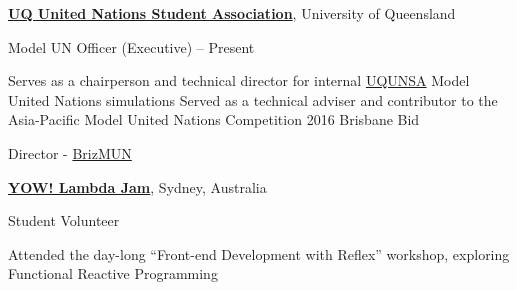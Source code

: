 \documentclass[a4paper,10pt,oneside]{article}
\begin{document}
\begin{body}
\EntryGap

\href{http://www.unsauq.org/}
{\textbf{UQ United Nations Student Association}}, University of Queensland

\par Model UN Officer (Executive)\hfill {} -- Present

\begin{detail}
\BulletItem Serves as a chairperson and technical director for internal \href{http://www.unsauq.org/}{UQUNSA} Model United Nations simulations 
\BulletItem Served as a technical adviser and contributor to the Asia-Pacific Model United Nations Competition 2016 Brisbane Bid
\end{detail}

\par Director - \href{http://www.brizmun.com/}{BrizMUN} \hfill {}

\EntryGap

\href{http://lambdajam.yowconference.com.au/}
{\textbf{YOW! Lambda Jam}}, Sydney, Australia  

\par Student Volunteer\hfill {} 

\begin{detail}
\BulletItem Attended the day-long ``Front-end Development with Reflex'' workshop, exploring Functional Reactive Programming
\end{detail}





\end{body}
\end{document}

